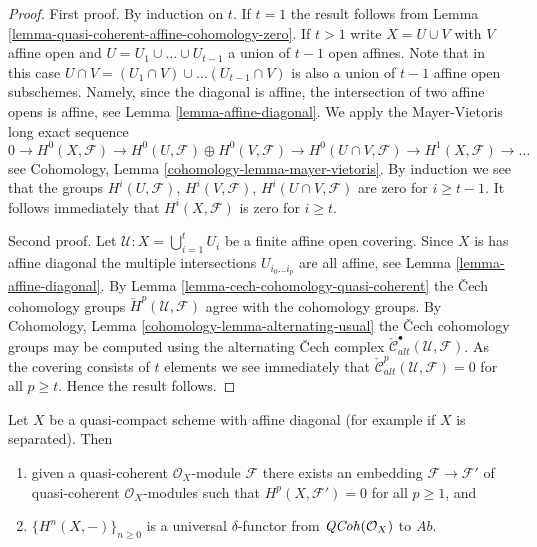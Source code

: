 \begin{proof}
First proof.
By induction on $t$.
If $t = 1$ the result follows from
Lemma \ref{lemma-quasi-coherent-affine-cohomology-zero}.
If $t > 1$ write $X = U \cup V$ with $V$ affine open and
$U = U_1 \cup \ldots \cup U_{t - 1}$ a union of $t - 1$ open affines.
Note that in this case
$U \cap V =  (U_1 \cap V) \cup \ldots (U_{t - 1} \cap V)$
is also a union of $t - 1$ affine open subschemes.
Namely, since the diagonal is affine, the intersection of two
affine opens is affine, see Lemma \ref{lemma-affine-diagonal}.
We apply the Mayer-Vietoris long exact sequence
$$
0 \to
H^0(X, \mathcal{F}) \to
H^0(U, \mathcal{F}) \oplus H^0(V, \mathcal{F}) \to
H^0(U \cap V, \mathcal{F}) \to
H^1(X, \mathcal{F}) \to \ldots
$$
see Cohomology, Lemma \ref{cohomology-lemma-mayer-vietoris}.
By induction we see that the groups $H^i(U, \mathcal{F})$,
$H^i(V, \mathcal{F})$, $H^i(U \cap V, \mathcal{F})$ are zero for
$i \geq t - 1$. It follows immediately that $H^i(X, \mathcal{F})$
is zero for $i \geq t$.

\medskip\noindent
Second proof.
Let $\mathcal{U} : X = \bigcup_{i = 1}^t U_i$ be a finite affine open
covering. Since $X$ is has affine diagonal the multiple intersections
$U_{i_0 \ldots i_p}$ are all affine, see
Lemma \ref{lemma-affine-diagonal}.
By Lemma \ref{lemma-cech-cohomology-quasi-coherent} the {\v C}ech
cohomology groups $\check{H}^p(\mathcal{U}, \mathcal{F})$
agree with the cohomology groups. By
Cohomology, Lemma \ref{cohomology-lemma-alternating-usual}
the {\v C}ech cohomology groups may be computed using the alternating
{\v C}ech complex $\check{\mathcal{C}}_{alt}^\bullet(\mathcal{U}, \mathcal{F})$.
As the covering consists of $t$ elements we see immediately
that $\check{\mathcal{C}}_{alt}^p(\mathcal{U}, \mathcal{F}) = 0$
for all $p \geq t$. Hence the result follows.
\end{proof}

\begin{lemma}
\label{lemma-affine-diagonal-universal-delta-functor}
Let $X$ be a quasi-compact scheme with affine diagonal
(for example if $X$ is separated). Then
\begin{enumerate}
\item given a quasi-coherent $\mathcal{O}_X$-module $\mathcal{F}$
there exists an embedding $\mathcal{F} \to \mathcal{F}'$ of
quasi-coherent $\mathcal{O}_X$-modules
such that $H^p(X, \mathcal{F}') = 0$ for all $p \geq 1$, and
\item $\{H^n(X, -)\}_{n \geq 0}$
is a universal $\delta$-functor from $\mathit{QCoh}(\mathcal{O}_X)$ to
$\textit{Ab}$.
\end{enumerate}
\end{lemma}

